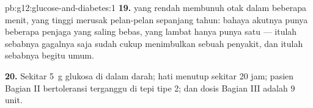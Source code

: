 \begin{solution}{pb:g12:glucose-and-diabetes:1}
\textbf{19.}  yang rendah membunuh otak dalam beberapa menit,
yang tinggi merusak pelan-pelan sepanjang tahun: bahaya akutnya punya
beberapa penjaga yang saling bebas, yang lambat hanya punya satu ---
itulah sebabnya gagalnya  saja sudah cukup menimbulkan sebuah
penyakit, dan itulah sebabnya  begitu umum.

\textbf{20.} Sekitar \qty{5}{g} glukosa di dalam darah;  hati
menutup sekitar 20 jam; pasien Bagian II bertoleransi terganggu di tepi
 tipe 2; dan dosis Bagian III adalah 9 unit.
\end{solution}
